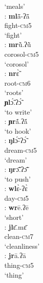 \documentclass[output=paper]{langscibook}
\begin{document}
\begin{exe}
\begin{multicols}{2}
\begin{xlisti}
                {}          `meals'\\
        \ex \glll [ml]:      \textbf{ml}ã̄-ʔã̄ \\
            {}          fight-\textsc{cm}5\\
            {}          `fight'\\
        \ex \glll  [mr]:       \textbf{mr}ũ̀.ʔũ̀ \\
            {}  corosol-\textsc{cm}5\\
            {}  `corosol'\\
        \ex \glll [nr]:      \textbf{nr}ɛ̃̀\\
            {}          root-\textsc{cm}6\\
            {}          `roots'\\
        \ex \gll [ɲl] \textbf{ɲl}ɔ̃́.ʔɔ̃́\\
            {}  {`to write'}\\
        \ex \gll [ɲr]:      \textbf{ɲr}ã́.ʔã́ \\
            {}      {`to hook'}\\
        \ex \glll [ŋl]:       \textbf{ŋl}ɔ̃́-ʔɔ̃́\\
            {} dream-\textsc{cm}5\\
            {} `dream'\\
        \ex \gll [ŋr]:       \textbf{ŋr}ɔ̃̄.ʔɔ̃̄    \\
            {}  {`to push'}\\
        \ex  \gll [wl]:       \textbf{wl}ɛ̀-ʔɛ̀ \\
                {}          day-\textsc{cm}5\\
        \ex \gll [wr]:       \textbf{wr}ē.ʔē  \\
                {}          `short'\\
        \ex \glll [jl]:         \textbf{jl}ɛ̄.mɛ̄ \\
            {}      clean-\textsc{cm}7\\
            {} `cleanliness'\\
        \ex \glll [jr]:       \textbf{jr}ā.ʔā\\
            {}              thing-\textsc{cm}5\\
            {}              `thing'\\
        \end{xlisti}
    \end{multicols}
\end{exe}
\end{document}
